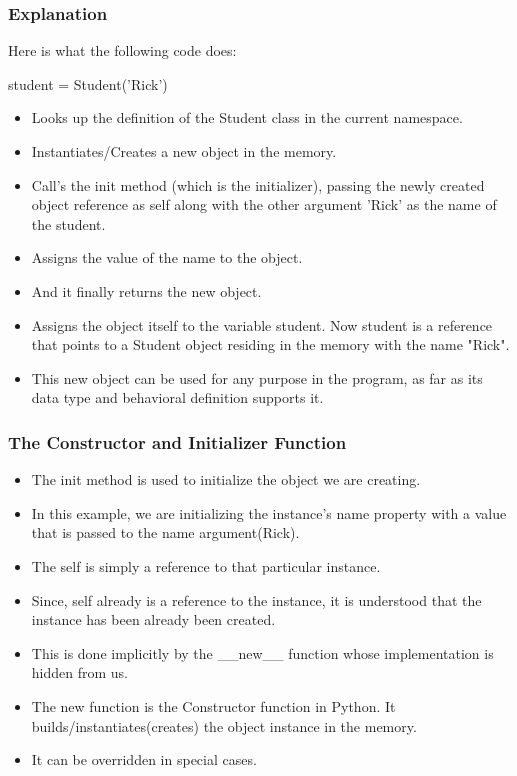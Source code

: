 \documentclass{beamer}
\begin{document}
\begin{frame}
\frametitle{Explanation}
Here is what the following code does:

student = Student('Rick')
\begin{itemize}
\item Looks up the definition of the Student class in the current namespace.
\item Instantiates/Creates a new object in the memory.
\item Call's the init method (which is the initializer), passing the newly created object reference as self along with the other argument 'Rick' as the name of the student.
\item Assigns the value of the name to the object.
\item And it finally returns the new object.
\item Assigns the object itself to the variable student. Now student is a reference that points to a Student object residing in the memory with the name "Rick".
\item This new object can be used for any purpose in the program, as far as its data type and behavioral definition supports it.
\end{itemize}
\end{frame}


\begin{frame}
\frametitle{The Constructor and Initializer Function}
\begin{itemize}
\item The init method is used to initialize the object we are creating.
\item In this example, we are initializing the  instance's name property with a value that is passed to the name argument(Rick).
\item The self is simply a reference to that particular instance.
\item Since, self already is a reference to the instance, it is understood that the instance has been already been created.
\item This is done implicitly by the \_\_new\_\_ function whose implementation is hidden from us. 
\item The new function is the Constructor function in Python. It builds/instantiates(creates) the object instance in the memory.
\item It can be overridden in special cases.
\end{itemize}
\end{frame}
\end{document}
